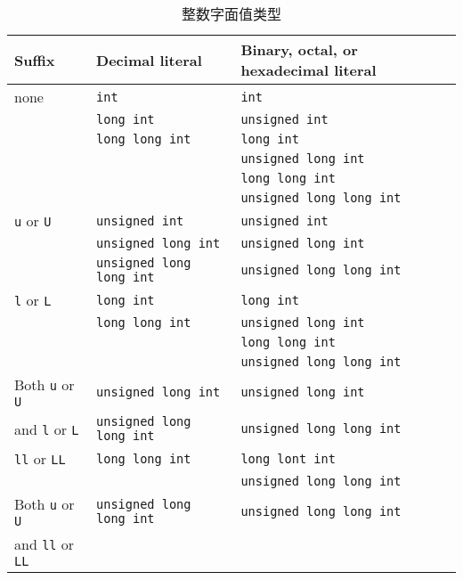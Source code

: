 \begin{table}[h!]
  \centering
  \caption{整数字面值类型}
  \begin{tabular}{|l|l|l|}
    \hline
    \textbf{Suffix} & \textbf{Decimal literal} &
      \textbf{Binary, octal, or hexadecimal literal}                          \\
    \hline
    none & \texttt{int}           & \texttt{int}                              \\
         & \texttt{long int}      & \texttt{unsigned int}                     \\
         & \texttt{long long int} & \texttt{long int}                         \\
         &                        & \texttt{unsigned long int}                \\
         &                        & \texttt{long long int}                    \\
         &                        & \texttt{unsigned long long int}           \\
    \hline
    \texttt{u} or \texttt{U} & \texttt{unsigned int} & \texttt{unsigned int}  \\
      & \texttt{unsigned long int}      & \texttt{unsigned long int}          \\
      & \texttt{unsigned long long int} & \texttt{unsigned long long int}     \\
    \hline
    \texttt{l} or \texttt{L}   & \texttt{long int} & \texttt{long int}        \\
      & \texttt{long long int} & \texttt{unsigned long int}                   \\
      & & \texttt{long long int}                                              \\
      & & \texttt{unsigned long long int}                                     \\
    \hline
    Both \texttt{u} or \texttt{U} & \texttt{unsigned long int}      &
      \texttt{unsigned long int}                                              \\
    and \texttt{l} or \texttt{L}  & \texttt{unsigned long long int} &
      \texttt{unsigned long long int}                                         \\
    \hline
    \texttt{ll} or \texttt{LL} & \texttt{long long int} &
      \texttt{long lont int}                                                  \\
      &  & \texttt{unsigned long long int}                                    \\
    \hline
    Both \texttt{u} or \texttt{U} & \texttt{unsigned long long int} &
      \texttt{unsigned long long int}                                         \\
    and \texttt{ll} or \texttt{LL} & &                                        \\
    \hline
  \end{tabular}
  \label{tab:int-lit-types}
\end{table}


